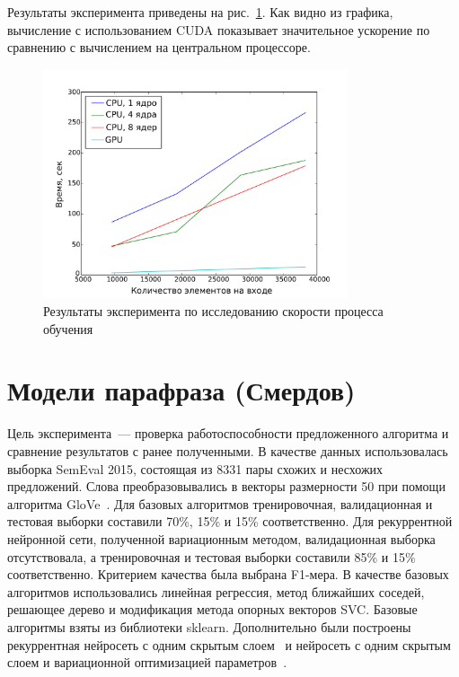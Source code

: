 Результаты эксперимента приведены на рис.~\ref{fig:speed}. Как видно из графика, вычисление с использованием CUDA показывает значительное ускорение по сравнению с вычислением на центральном процессоре.

\begin{figure}[tb!]
 \centering
  \includegraphics[width=0.8\textwidth]{plots/popova/result.pdf}
 \caption{Результаты эксперимента по исследованию скорости процесса обучения}
 \label{fig:speed}
\end{figure}




\section{Модели парафраза (Смердов)}
Цель эксперимента~--- проверка работоспособности предложенного алгоритма и сравнение результатов с ранее полученными. В качестве данных использовалась выборка SemEval 2015, состоящая из 8331 пары схожих и несхожих предложений. Слова преобразовывались в векторы размерности 50 при помощи алгоритма GloVe~\cite{GloveURL}.
Для базовых алгоритмов тренировочная, валидационная и тестовая выборки составили 70\%, 15\% и 15\% соответственно.
Для рекуррентной нейронной сети, полученной вариационным методом, валидационная выборка отсутствовала, а тренировочная и тестовая выборки составили 85\% и 15\% соответственно.
Критерием качества была выбрана F1-мера.
В качестве базовых алгоритмов использовались линейная регрессия, метод ближайших соседей, решающее дерево и модификация метода опорных векторов SVC. Базовые алгоритмы взяты из библиотеки sklearn. 
Дополнительно были построены рекуррентная нейросеть с одним скрытым слоем~\cite{Sanborn} и нейросеть с одним скрытым слоем и вариационной оптимизацией параметров~\cite{Graves, code}.


